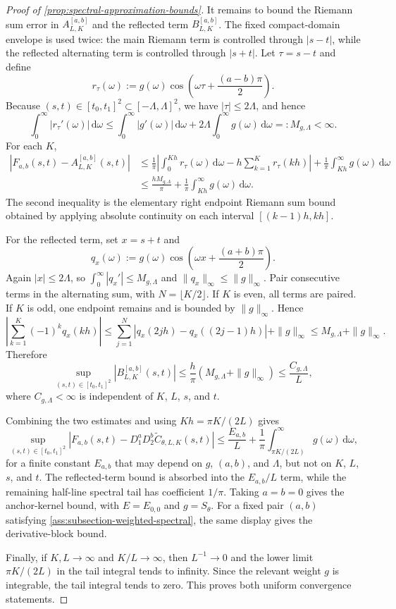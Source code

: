 \documentclass[11pt,a4paper]{article}
\theoremstyle{definition}
\theoremstyle{remark}
\begin{document}
\begin{proof}[Proof of \cref{prop:spectral-approximation-bounds}]
It remains to bound the Riemann sum error in $A_{L,K}^{[a,b]}$ and the reflected term $B_{L,K}^{[a,b]}$. The fixed compact-domain envelope is used twice: the main Riemann term is controlled through \(|s-t|\), while the reflected alternating term is controlled through \(|s+t|\). Let $\tau=s-t$ and define
\[
    r_\tau(\omega)
    :=g(\omega)\cos\!\left(\omega\tau+\frac{(a-b)\pi}{2}\right).
\]
Because $(s,t)\in[t_0,t_1]^2\subset[-\Lambda,\Lambda]^2$, we have $|\tau|\le 2\Lambda$, and hence
\[
\int_0^\infty |r_\tau'(\omega)|\,\mathrm d\omega
\le
\int_0^\infty |g'(\omega)|\,\mathrm d\omega
+2\Lambda\int_0^\infty g(\omega)\,\mathrm d\omega
=:M_{g,\Lambda}<\infty .
\]
For each $K$,
\begin{align*}
\left|F_{a,b}(s,t)-A_{L,K}^{[a,b]}(s,t)\right|
&\le
\frac{1}{\pi}
\left|\int_0^{Kh} r_\tau(\omega)\,\mathrm d\omega
      -h\sum_{k=1}^K r_\tau(kh)\right|
+
\frac{1}{\pi}\int_{Kh}^\infty g(\omega)\,\mathrm d\omega  \\
&\le
\frac{hM_{g,\Lambda}}{\pi}
+
\frac{1}{\pi}\int_{Kh}^\infty g(\omega)\,\mathrm d\omega .
\end{align*}
The second inequality is the elementary right endpoint Riemann sum bound obtained by applying absolute continuity on each interval $[(k-1)h,kh]$.

For the reflected term, set $x=s+t$ and
\[
    q_x(\omega)
    :=g(\omega)\cos\!\left(\omega x+\frac{(a+b)\pi}{2}\right).
\]
Again $|x|\le 2\Lambda$, so $\int_0^\infty |q_x'|\le M_{g,\Lambda}$ and $\|q_x\|_\infty\le\|g\|_\infty$. Pair consecutive terms in the alternating sum, with \(N=\lfloor K/2\rfloor\). If \(K\) is even, all terms are paired. If \(K\) is odd, one endpoint remains and is bounded by \(\|g\|_\infty\). Hence
\[
\left|\sum_{k=1}^K(-1)^k q_x(kh)\right|
\le
\sum_{j=1}^N |q_x(2jh)-q_x((2j-1)h)|+\|g\|_\infty
\le
M_{g,\Lambda}+\|g\|_\infty .
\]
Therefore
\[
\sup_{(s,t)\in[t_0,t_1]^2}
\left|B_{L,K}^{[a,b]}(s,t)\right|
\le
\frac{h}{\pi}(M_{g,\Lambda}+\|g\|_\infty)
\le
\frac{C_{g,\Lambda}}{L},
\]
where $C_{g,\Lambda}<\infty$ is independent of $K$, $L$, $s$, and $t$.

Combining the two estimates and using $Kh=\pi K/(2L)$ gives
\[
\sup_{(s,t)\in[t_0,t_1]^2}
\left|F_{a,b}(s,t)-D_1^aD_2^b\widetilde C_{\theta,L,K}(s,t)\right|
\le
\frac{E_{a,b}}{L}
+
\frac{1}{\pi}\int_{\pi K/(2L)}^\infty g(\omega)\,\mathrm d\omega,
\]
for a finite constant $E_{a,b}$ that may depend on \(g\), \((a,b)\), and \(\Lambda\), but not on $K$, $L$, $s$, and $t$. The reflected-term bound is absorbed into the \(E_{a,b}/L\) term, while the remaining half-line spectral tail has coefficient \(1/\pi\). Taking $a=b=0$ gives the anchor-kernel bound, with $E=E_{0,0}$ and $g=S_\theta$. For a fixed pair $(a,b)$ satisfying \cref{ass:subsection-weighted-spectral}, the same display gives the derivative-block bound.

Finally, if $K,L\to\infty$ and $K/L\to\infty$, then $L^{-1}\to0$ and the lower limit $\pi K/(2L)$ in the tail integral tends to infinity. Since the relevant weight $g$ is integrable, the tail integral tends to zero. This proves both uniform convergence statements.
\end{proof}
\end{document}
